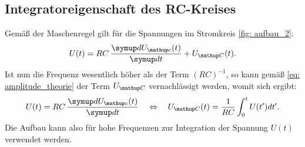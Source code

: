 \subsection{Integratoreigenschaft des RC-Kreises}
Gemäß der Maschenregel gilt für die Spannungen im Stromkreis \ref{fig: aufbau_2}:
\begin{equation}
  U(t) = RC\,\frac{\dif{U\ua{c}(t)}}{\dif{t}} + U\ua{C}(t).
\end{equation}
Ist nun die Frequenz wesentlich höher als der Term $(RC)^{-1}$, so kann gemäß \eqref{eq: amplitude_theorie} der Term $U\ua{C}$ vernachlässigt werden, womit
sich ergibt:
\begin{equation}
  U(t) = RC\,\frac{\dif{U\ua{c}(t)}}{\dif{t}} \quad \Leftrightarrow \quad U\ua{C}(t) = \frac{1}{RC}\int_0^t U(t')dt'.
\end{equation}
Die Aufbau kann also für hohe Frequenzen zur Integration der Spannung $U(t)$ verwendet werden.
